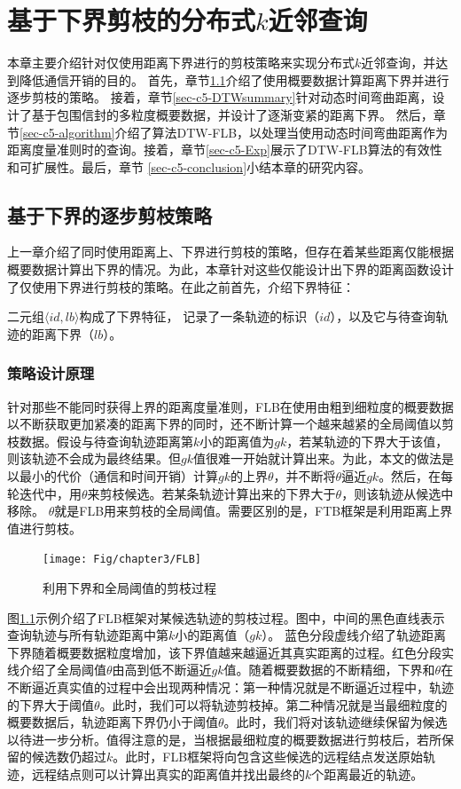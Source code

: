 \chapter{基于下界剪枝的分布式$k$近邻查询}\label{chapter:FLBDTW}

本章主要介绍针对仅使用距离下界进行的剪枝策略来实现分布式$k$近邻查询，并达到降低通信开销的目的。
首先，章节\ref{sec-c5-FLB}介绍了使用概要数据计算距离下界并进行逐步剪枝的策略。
接着，章节\ref{sec-c5-DTWsummary}针对动态时间弯曲距离，设计了基于包围信封的多粒度概要数据，并设计了逐渐变紧的距离下界。
然后，章节\ref{sec-c5-algorithm}介绍了算法DTW-FLB，以处理当使用动态时间弯曲距离作为距离度量准则时的查询。接着，章节\ref{sec-c5-Exp}展示了DTW-FLB算法的有效性和可扩展性。最后，章节 \ref{sec-c5-conclusion}小结本章的研究内容。



\section{基于下界的逐步剪枝策略}\label{sec-c5-FLB}
上一章介绍了同时使用距离上、下界进行剪枝的策略，但存在着某些距离仅能根据概要数据计算出下界的情况。为此，本章针对这些仅能设计出下界的距离函数设计了仅使用下界进行剪枝的策略。在此之前首先，介绍下界特征：
\begin{define} 二元组$\langle id,lb \rangle$构成了下界特征， 记录了一条轨迹的标识（$id$），以及它与待查询轨迹的距离下界（$lb$）。
\end{define}
\subsection{策略设计原理}
针对那些不能同时获得上界的距离度量准则，FLB在使用由粗到细粒度的概要数据以不断获取更加紧凑的距离下界的同时，还不断计算一个越来越紧的全局阈值以剪枝数据。假设与待查询轨迹距离第$k$小的距离值为$gk$，若某轨迹的下界大于该值，则该轨迹不会成为最终结果。但$gk$值很难一开始就计算出来。为此，本文的做法是以最小的代价（通信和时间开销）计算$gk$的上界$\theta$，并不断将$\theta$逼近$gk$。然后，在每轮迭代中，用$\theta$来剪枝候选。若某条轨迹计算出来的下界大于$\theta$，则该轨迹从候选中移除。
$\theta$就是FLB用来剪枝的全局阈值。需要区别的是，FTB框架是利用距离上界值进行剪枝。

\begin{figure}
	\centering
	\texttt{[image: Fig/chapter3/FLB]}
	\caption{利用下界和全局阈值的剪枝过程}
	\label{fig-chapter3-FLB}
\end{figure}

图\ref{fig-chapter3-FLB}示例介绍了FLB框架对某候选轨迹的剪枝过程。图中，中间的黑色直线表示查询轨迹与所有轨迹距离中第$k$小的距离值（$gk$）。
蓝色分段虚线介绍了轨迹距离下界随着概要数据粒度增加，该下界值越来越逼近其真实距离的过程。红色分段实线介绍了全局阈值$\theta$由高到低不断逼近$gk$值。随着概要数据的不断精细，下界和$\theta$在不断逼近真实值的过程中会出现两种情况：第一种情况就是不断逼近过程中，轨迹的下界大于阈值$\theta$。此时，我们可以将轨迹剪枝掉。第二种情况就是当最细粒度的概要数据后，轨迹距离下界仍小于阈值$\theta$。此时，我们将对该轨迹继续保留为候选以待进一步分析。值得注意的是，当根据最细粒度的概要数据进行剪枝后，若所保留的候选数仍超过$k$。此时，FLB框架将向包含这些候选的远程结点发送原始轨迹，远程结点则可以计算出真实的距离值并找出最终的$k$个距离最近的轨迹。

